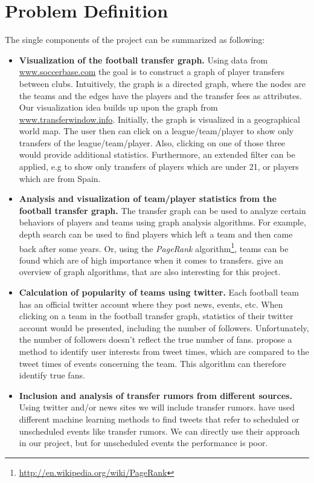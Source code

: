 \documentclass{article}
\begin{document}
\section{Problem Definition}
The single components of the project can be summarized as following:
\begin{itemize}
	\item \textbf{Visualization of the football transfer graph.} Using data from \url{www.soccerbase.com} the goal is to construct a graph of player transfers between clubs. Intuitively, the graph is a directed graph, where the nodes are the teams and the edges have the players and the transfer fees as attributes. Our visualization idea builds up upon the graph from \url{www.transferwindow.info}. Initially, the graph is visualized in a geographical world map. The user then can click on a league/team/player to show only transfers of the league/team/player. Also, clicking on one of those three would provide additional statistics. Furthermore, an extended filter can be applied, e.g to show only transfers of players which are under 21, or players which are from Spain.
	
	\item \textbf{Analysis and visualization of team/player statistics from the football transfer graph.} The transfer graph can be used to analyze certain behaviors of players and teams using graph analysis algorithms. For example, depth search can be used to find players which left a team and then came back after some years. Or, using the \emph{PageRank} algorithm\footnote{\url{http://en.wikipedia.org/wiki/PageRank}}, teams can be found which are of high importance when it comes to transfers. \cite{brath} give an overview of graph algorithms, that are also interesting for this project.
	
	\item \textbf{Calculation of popularity of teams using twitter.} Each football team has an official twitter account where they post news, events, etc. When clicking on a team in the football transfer graph, statistics of their twitter account would be presented, including the number of followers. Unfortunately, the number of followers doesn't reflect the true number of fans. \cite{Ramasamy:2013:IUI:2512938.2512960} propose a method to identify user interests from tweet times, which are compared to the tweet times of events concerning the team. This algorithm can therefore identify true fans.
	
	\item \textbf{Inclusion and analysis of transfer rumors from different sources.} Using twitter and/or news sites we will include transfer rumors. \cite{Kunneman+12} have used different machine learning methods to find tweets that refer to scheduled or unscheduled events like transfer rumors. We can directly use their approach in our project, but for unscheduled events the performance is poor.
	

\end{itemize}
\end{document}
